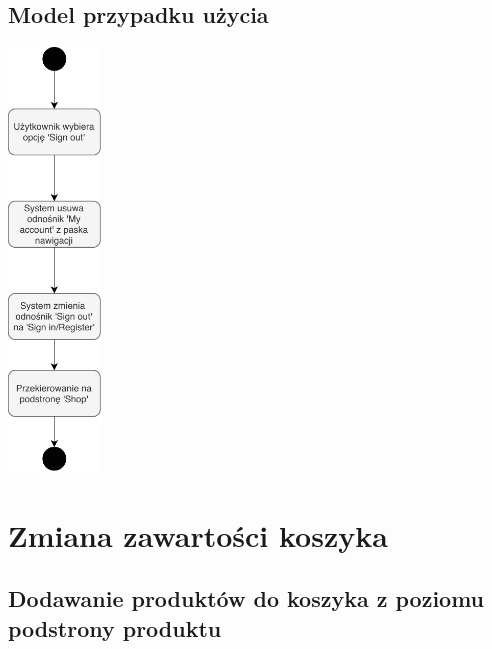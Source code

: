 \documentclass[10pt]{report}
\begin{document}
			\subsection{Model przypadku użycia}
			\begin{center}
				\includegraphics[width=70pt]{wylogowanie.pdf}
			\end{center}
			 
		
		
	\section{Zmiana zawartości koszyka}
	
		\subsection{Dodawanie produktów do koszyka z poziomu podstrony produktu}
		
\end{document}
